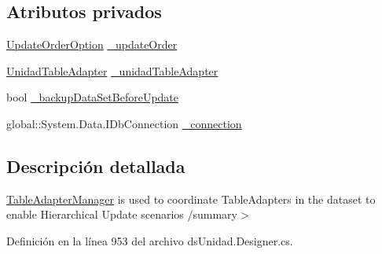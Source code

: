 \subsection*{Atributos privados}
\begin{DoxyCompactItemize}
\item 
\hyperlink{class_proyecto___integrador__3_1_1ds_unidad_table_adapters_1_1_table_adapter_manager_abc7bc304d216e1258eb95cc9c8b98997}{Update\-Order\-Option} \hyperlink{class_proyecto___integrador__3_1_1ds_unidad_table_adapters_1_1_table_adapter_manager_af56e208c6589dbe5e87571536258d271}{\-\_\-update\-Order}
\item 
\hyperlink{class_proyecto___integrador__3_1_1ds_unidad_table_adapters_1_1_unidad_table_adapter}{Unidad\-Table\-Adapter} \hyperlink{class_proyecto___integrador__3_1_1ds_unidad_table_adapters_1_1_table_adapter_manager_ad273398026bf55cc8cff4c34547f7564}{\-\_\-unidad\-Table\-Adapter}
\item 
bool \hyperlink{class_proyecto___integrador__3_1_1ds_unidad_table_adapters_1_1_table_adapter_manager_abf5b5140a09c67f9368870e4c5161fa2}{\-\_\-backup\-Data\-Set\-Before\-Update}
\item 
global\-::\-System.\-Data.\-I\-Db\-Connection \hyperlink{class_proyecto___integrador__3_1_1ds_unidad_table_adapters_1_1_table_adapter_manager_a4568ec533465a03584b39842ada40447}{\-\_\-connection}
\end{DoxyCompactItemize}


\subsection{Descripción detallada}
\hyperlink{class_proyecto___integrador__3_1_1ds_unidad_table_adapters_1_1_table_adapter_manager}{Table\-Adapter\-Manager} is used to coordinate Table\-Adapters in the dataset to enable Hierarchical Update scenarios /summary$>$ 

Definición en la línea 953 del archivo ds\-Unidad.\-Designer.\-cs.



